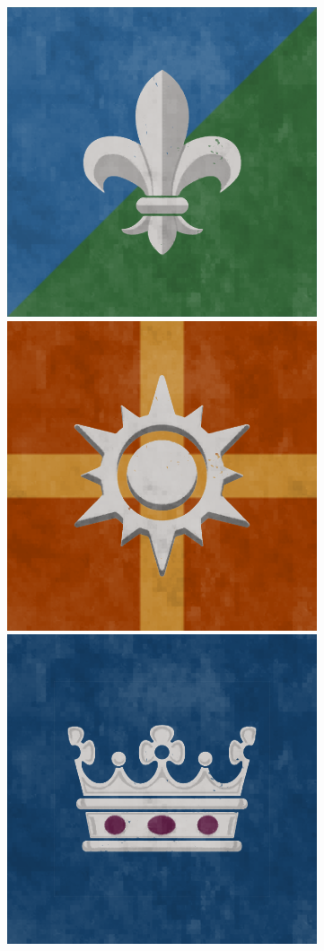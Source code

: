 \begin{figure}[!ht]
        \includegraphics[scale=0.25]{img/flag/fsn.png}
        \includegraphics[scale=0.25]{img/flag/hereroq.png}
        \includegraphics[scale=0.25]{img/flag/idc.png}

\end{figure}
